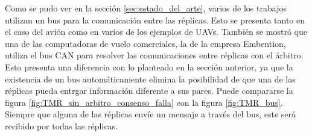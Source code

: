 Como se pudo ver en la sección \ref{sec:estado_del_arte}, varios de los trabajos  utilizan un bus para la comunicación entre las réplicas. Esto se presenta tanto en el caso del avión como en varios de los ejemplos de UAVs. También se mostró que una de las computadoras de vuelo comerciales, la de la empresa Embention, utiliza el bus CAN para resolver las comunicaciones entre réplicas con el árbitro. %
Esto presenta una diferencia con lo planteado en la sección anterior, ya que la existencia de un bus automáticamente elimina la posibilidad de que una de las réplicas pueda entrgar información diferente a sus pares. Puede compararse la figura \ref{fig:TMR_sin_arbitro_consenso_falla} con la figura \ref{fig:TMR_bus}. Siempre que alguna de las réplicas envíe un mensaje a través del bus, este será recibido por todas las réplicas.




